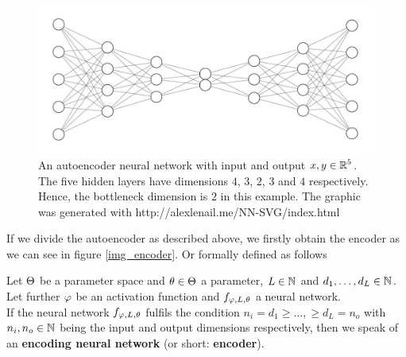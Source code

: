 \begin{figure}[H]
\begin{center}
   \begin{minipage}[b]{0.9\linewidth}
      \includegraphics[width=\linewidth]{autoencoder}
      \caption{An autoencoder neural network with input and output $x, y\in \operatorname{\mathbb{R}}^5$. The five hidden layers have dimensions $4$, $3$, $2$, $3$ and $4$ respectively. Hence, the bottleneck dimension is $2$ in this example. The graphic was generated with http://alexlenail.me/NN-SVG/index.html}\label{autoencoder}
	\end{minipage}
\end{center}
\end{figure}


If we divide the autoencoder as described above, we firstly obtain the encoder as we can see in figure \ref{img_encoder}. Or formally defined as follows

\begin{lemma}\label{def_encoder}
Let $\operatorname{\Theta}$ be a parameter space and $\theta \in \operatorname{\Theta}$ a parameter, $L\in \operatorname{\mathbb{N}}$ and $d_1,\ldots, d_L\in\operatorname{\mathbb{N}}$. Let further $\operatorname{\varphi}$ be an activation function and $f_{\operatorname{\varphi},L,\theta}$ a neural network.\\
If the neural network $f_{\operatorname{\varphi},L,\theta}$ fulfils the condition $n_i= d_1 \geq \ldots, \geq d_L = n_o$ with $n_i, n_o \in \operatorname{\mathbb{N}}$ being the input and output dimensions respectively, then we speak of an \textbf{encoding neural network} (or short: \textbf{encoder}).
\end{lemma}


